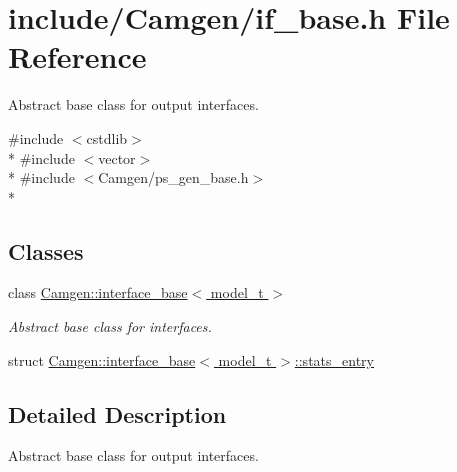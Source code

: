 \hypertarget{a00666}{}\section{include/\+Camgen/if\+\_\+base.h File Reference}
\label{a00666}


Abstract base class for output interfaces.  


{\ttfamily \#include $<$cstdlib$>$}\\*
{\ttfamily \#include $<$vector$>$}\\*
{\ttfamily \#include $<$Camgen/ps\+\_\+gen\+\_\+base.\+h$>$}\\*
\subsection*{Classes}
\begin{DoxyCompactItemize}
\item 
class \hyperlink{a00317}{Camgen\+::interface\+\_\+base$<$ model\+\_\+t $>$}
\begin{DoxyCompactList}\small\item\em Abstract base class for interfaces. \end{DoxyCompactList}\item 
struct \hyperlink{a00523}{Camgen\+::interface\+\_\+base$<$ model\+\_\+t $>$\+::stats\+\_\+entry}
\end{DoxyCompactItemize}


\subsection{Detailed Description}
Abstract base class for output interfaces. 

